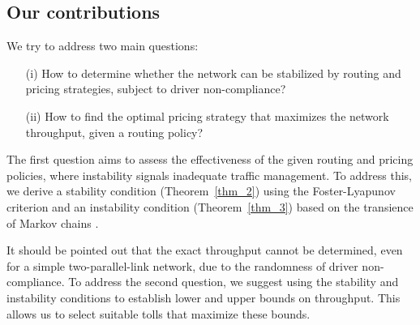 \subsection{Our contributions}
We try to address two main questions:
\begin{enumerate}
    \item[(i)] How to determine whether the network can be stabilized by routing and pricing strategies, subject to driver non-compliance?
    
    \item[(ii)] How to find the optimal pricing strategy that maximizes the network throughput, given a routing policy?
\end{enumerate}


The first question aims to assess the effectiveness of the given routing and pricing policies, where instability signals inadequate traffic management. To address this, we derive a stability condition (Theorem~\ref{thm_2}) using the Foster-Lyapunov criterion \cite{meyn2012markov} and an instability condition (Theorem~\ref{thm_3}) based on the transience of Markov chains \cite{meyn2012markov}.


It should be pointed out that the exact throughput cannot be determined, even for a simple two-parallel-link network, due to the randomness of driver non-compliance. To address the second question, we suggest using the stability and instability conditions to establish lower and upper bounds on throughput. This allows us to select suitable tolls that maximize these bounds.